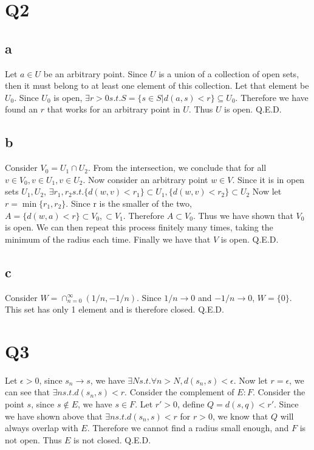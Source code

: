 \documentclass[12pt]{article}
\begin{document}
\section{Q2}
\subsection{a}
Let $a \in U$ be an arbitrary point. Since $U$ is a union of a collection of open sets, then it must belong to at least one element of this collection. Let that element be $U_0$.
\newline
Since $U_0$ is open, $\exists r>0 s.t. S=\{s \in S | d(a,s)<r\} \subseteq U_0$. Therefore we have found an $r$ that works for an arbitrary point in $U$. Thus $U$ is open. Q.E.D.

\subsection{b}
Consider $V_0 = U_1 \cap U_2$.
\newline
From the intersection, we conclude that for all $v \in V_0, v \in U_1, v \in U_2$. Now consider an arbitrary point $w \in V$. Since it is in open sets $U_1, U_2$, $\exists r_1, r_2 s.t. \{d(w,v)<r_1\} \subset U_1, \{d(w,v)<r_2\} \subset U_2$
\newline
Now let $r = \min \{r_1, r_2\}$. Since r is the smaller of the two, $A = \{d(w, a)<r \} \subset V_0, \subset V_1$. Therefore $A \subset V_0$. Thus we have shown that $V_0$ is open.
\newline
We can then repeat this process finitely many times, taking the minimum of the radius each time. Finally we have that $V$ is open. Q.E.D.

\subsection{c}
Consider $W = \cap ^\infty _{n=0} (1/n, -1/n)$. Since $1/n \to 0$ and $-1/n \to 0$, $W = \{0\}$. This set has only 1 element and is therefore closed. Q.E.D.
\newpage


\section{Q3}
Let $\epsilon > 0$, since $s_n \to s$, we have $\exists N s.t. \forall n>N, d(s_n,s)<\epsilon$. Now let $r = \epsilon$, we can see that $\exists n s.t. d(s_n, s)<r$.
\newline
Consider the complement of $E: F$. Consider the point $s$, since $s \notin E$, we have $s \in F$. Let $r' > 0$, define $Q = d(s,q)<r'$. Since we have shown above that $\exists n s.t. d(s_n, s)<r$ for $r>0$, we know that $Q$ will always overlap with $E$. Therefore we cannot find a radius small enough, and $F$ is not open. Thus $E$ is not closed. Q.E.D.
\newpage
\end{document}
